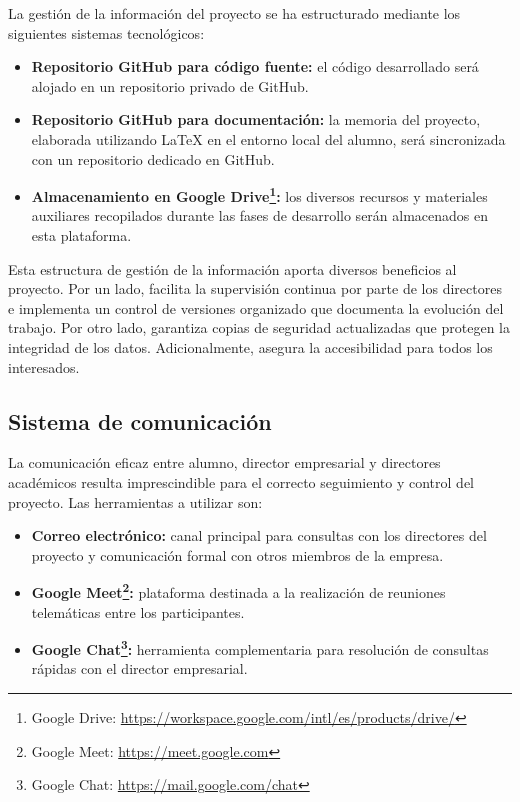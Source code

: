 La gestión de la información del proyecto se ha estructurado mediante los siguientes sistemas tecnológicos:
\begin{itemize}
\item \textbf{Repositorio GitHub para código fuente:} el código desarrollado será alojado en un repositorio privado de GitHub.
\item \textbf{Repositorio GitHub para documentación:} la memoria del proyecto, elaborada utilizando LaTeX en el entorno local del alumno, será sincronizada con un repositorio dedicado en GitHub.
\item \textbf{Almacenamiento en Google Drive\footnote{Google Drive: \url{https://workspace.google.com/intl/es/products/drive/}}:} los diversos recursos y materiales auxiliares recopilados durante las fases de desarrollo serán almacenados en esta plataforma.
\end{itemize}
Esta estructura de gestión de la información aporta diversos beneficios al proyecto. Por un lado, facilita la supervisión continua por parte de los directores e implementa un control de versiones organizado que documenta la evolución del trabajo. Por otro lado, garantiza copias de seguridad actualizadas que protegen la integridad de los datos. Adicionalmente, asegura la accesibilidad para todos los interesados.


\subsection{Sistema de comunicación}
La comunicación eficaz entre alumno, director empresarial y directores académicos resulta imprescindible para el correcto seguimiento y control del proyecto. Las herramientas a utilizar son:
\begin{itemize}
\item\textbf{Correo electrónico: }canal principal para consultas con los directores del proyecto y comunicación formal con otros miembros de la empresa.
\item\textbf{Google Meet\footnote{Google Meet: \url{https://meet.google.com}}: }plataforma destinada a la realización de reuniones telemáticas entre los participantes.
\item\textbf{Google Chat\footnote{Google Chat: \url{https://mail.google.com/chat}}: }herramienta complementaria para resolución de consultas rápidas con el director empresarial.
\end{itemize}

